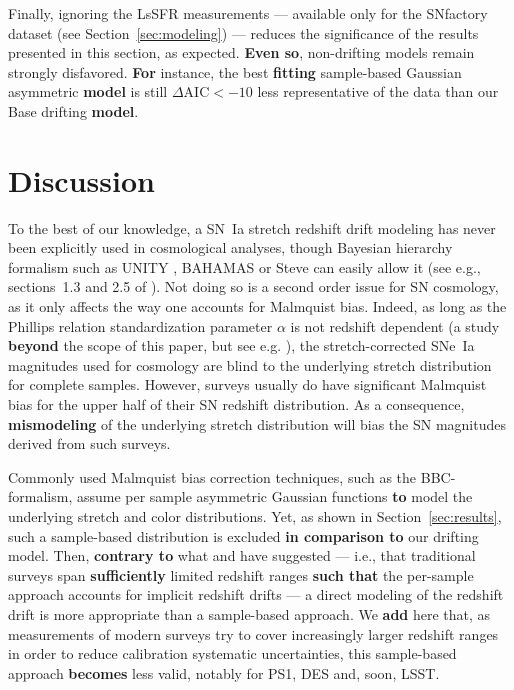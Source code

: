 \documentclass[]{aa}
\begin{document}
Finally, ignoring the LsSFR measurements --- available only for the SNfactory
dataset (see Section~\ref{sec:modeling}) --- reduces the significance of the
results presented in this section, as expected. \textbf{Even so}, non-drifting
models remain strongly disfavored. \textbf{For} instance, the best
\textbf{fitting} sample-based Gaussian asymmetric \textbf{model} is still
$\Delta\mathrm{AIC}<-10$ less representative of the data than our Base drifting
\textbf{model}.

\section{Discussion}\label{sec:discussion}

To the best of our knowledge, a SN~Ia stretch redshift drift modeling has never
been explicitly used in cosmological analyses, though Bayesian hierarchy
formalism such as UNITY \citep{rubin2015}, BAHAMAS \citep{shariff2016} or Steve
\citep{hinton2019} can easily allow it (see e.g., sections~1.3 and 2.5 of
\cite{rubin2015}). Not doing so is a second order issue for SN cosmology, as it
only affects the way one accounts for Malmquist bias. Indeed, as long as the
Phillips relation \citep{phillips1993} standardization parameter $\alpha$ is not
redshift dependent (a study \textbf{beyond} the scope of this paper, but see
e.g. \citealt{scolnic2018a}), the stretch-corrected SNe~Ia magnitudes used for
cosmology are blind to the underlying stretch distribution for complete samples.
However, surveys usually do have significant Malmquist bias for the upper half
of their SN redshift distribution. As a consequence, \textbf{mismodeling} of the
underlying stretch distribution will bias the SN magnitudes derived from such
surveys. 

Commonly used Malmquist bias correction techniques, such as the BBC-formalism,
assume per sample asymmetric Gaussian functions \textbf{to} model the underlying
stretch and color distributions. Yet, as shown in Section~\ref{sec:results},
such a sample-based distribution is excluded \textbf{in comparison to} our
drifting model. Then, \textbf{contrary to} what \citet[][Section~2]{scolnic2016}
and \citet[][Section~5.4]{scolnic2018a} have suggested --- i.e., that
traditional surveys span \textbf{sufficiently} limited redshift ranges
\textbf{such that} the per-sample approach accounts for implicit redshift drifts
--- a direct modeling of the redshift drift is more appropriate than a
sample-based approach. We \textbf{add} here that, as measurements of modern
surveys try to cover increasingly larger redshift ranges in order to reduce
calibration systematic uncertainties, this sample-based approach
\textbf{becomes} less valid, notably for PS1, DES and, soon, LSST.
\end{document}
